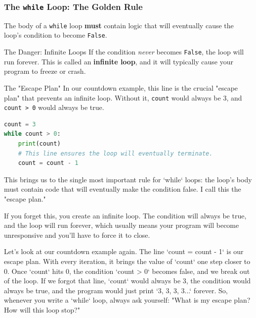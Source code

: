\documentclass{beamer}
\begin{document}
\begin{frame}[fragile]
    \frametitle{The \texttt{while} Loop: The Golden Rule}
    
    The body of a \texttt{while} loop \textbf{must} contain logic that will eventually cause the loop's condition to become \texttt{False}.
    
    \begin{alertblock}{The Danger: Infinite Loops}
        If the condition \textit{never} becomes \texttt{False}, the loop will run forever. This is called an \textbf{infinite loop}, and it will typically cause your program to freeze or crash.
    \end{alertblock}
    
    \vspace{1em}
    
    \begin{block}{The "Escape Plan"}
    In our countdown example, this line is the crucial "escape plan" that prevents an infinite loop. Without it, \texttt{count} would always be 3, and \texttt{count > 0} would always be true.
    
    \begin{lstlisting}[language=Python]
count = 3
while count > 0:
    print(count)
    # This line ensures the loop will eventually terminate.
    count = count - 1 
    \end{lstlisting}
    \end{block}
    
    \begin{note}
    This brings us to the single most important rule for `while` loops: the loop's body must contain code that will eventually make the condition false. I call this the "escape plan."

    If you forget this, you create an infinite loop. The condition will always be true, and the loop will run forever, which usually means your program will become unresponsive and you'll have to force it to close.

    Let's look at our countdown example again. The line `count = count - 1` is our escape plan. With every iteration, it brings the value of `count` one step closer to 0. Once `count` hits 0, the condition `count > 0` becomes false, and we break out of the loop. If we forgot that line, `count` would always be 3, the condition would always be true, and the program would just print `3, 3, 3, 3...` forever. So, whenever you write a `while` loop, always ask yourself: "What is my escape plan? How will this loop stop?"
    \end{note}
\end{frame}
\end{document}
